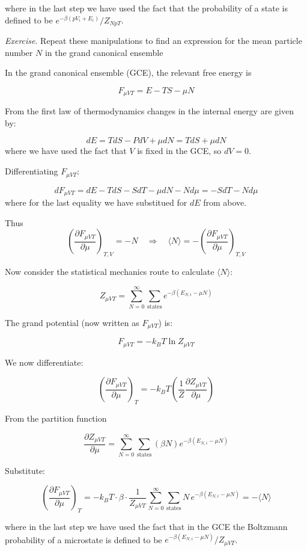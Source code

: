 \documentclass[
  letterpaper,
  DIV=11,
  numbers=noendperiod]{scrreprt}
\begin{document}
where in the last step we have used the fact that the probability of a
state is defined to be \(e^{-\beta (p V_i+E_i)}/Z_{NpT}\).

\emph{Exercise}. Repeat these manipulations to find an expression for
the mean particle number \(N\) in the grand canonical ensemble

\begin{tcolorbox}[enhanced jigsaw, bottomrule=.15mm, colframe=quarto-callout-caution-color-frame, breakable, rightrule=.15mm, colback=white, toprule=.15mm, opacityback=0, colbacktitle=quarto-callout-caution-color!10!white, coltitle=black, title=\textcolor{quarto-callout-caution-color}{\faFire}\hspace{0.5em}{Solution}, toptitle=1mm, titlerule=0mm, bottomtitle=1mm, arc=.35mm, opacitybacktitle=0.6, leftrule=.75mm, left=2mm]

In the grand canonical ensemble (GCE), the relevant free energy is

\[
F_{\mu VT} = E - TS - \mu N
\]

From the first law of thermodynamics changes in the internal energy are
given by:

\[
dE = TdS - PdV + \mu dN=TdS+\mu dN
\] where we have used the fact that \(V\) is fixed in the GCE, so
\(dV=0\).

Differentiating \(F_{\mu VT}\):

\[
dF_{\mu VT} = dE - TdS - SdT - \mu dN - N d\mu
= -S dT - N d\mu
\] where for the last equality we have substitued for \(dE\) from above.

Thus \[
\left( \frac{\partial F_{\mu VT}}{\partial \mu} \right)_{T, V} = -N
\quad \Rightarrow \quad
\langle N \rangle = -\left( \frac{\partial F_{\mu VT}}{\partial \mu} \right)_{T, V}
\]

Now consider the statistical mechanics route to calculate
\(\langle N\rangle\):

\[
Z_{\mu V T} = \sum_{N=0}^{\infty} \sum_{\text{states}} e^{-\beta (E_{N,i} - \mu N)}
\]

The grand potential (now written as \(F_{\mu VT}\)) is:

\[
F_{\mu VT} = -k_B T \ln Z_{\mu V T}
\]

We now differentiate:

\[
\left( \frac{\partial F_{\mu VT}}{\partial \mu} \right)_T = -k_B T \left( \frac{1}{Z} \frac{\partial Z_{\mu V T}}{\partial \mu} \right)
\]

From the partition function

\[
\frac{\partial Z_{\mu V T}}{\partial \mu} = \sum_{N=0}^\infty \sum_{\text{states}} \left( \beta N \right) e^{-\beta (E_{N,i} - \mu N)} 
\]

Substitute:

\[
\left( \frac{\partial F_{\mu VT}}{\partial \mu} \right)_T = -k_B T \cdot \beta \cdot \frac{1}{Z_{\mu V T}} \sum_{N=0}^\infty \sum_{\text{states}} N\, e^{-\beta (E_{N,i} - \mu N)} = - \langle N \rangle
\]

where in the last step we have used the fact that in the GCE the
Boltzmann probability of a microstate is defined to be
\(e^{-\beta (E_{N,i}-\mu N)}/Z_{\mu VT}\).

\end{tcolorbox}
\end{document}
